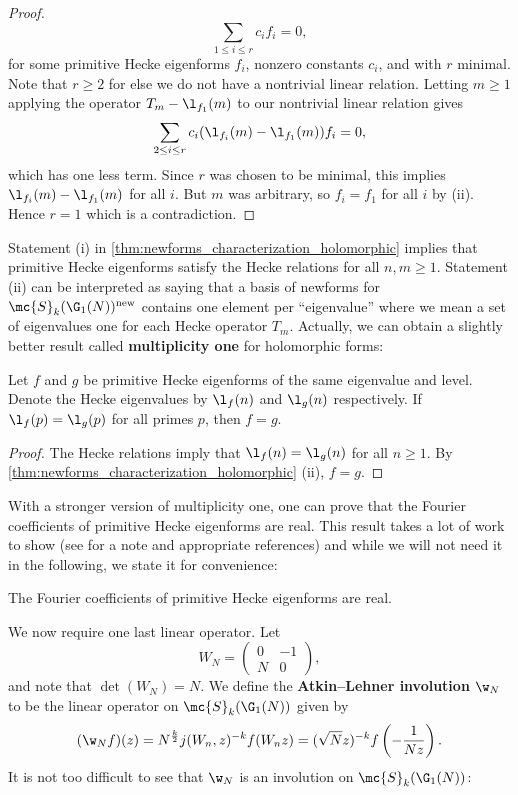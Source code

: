 \begin{proof}
      \[
        \sum_{1 \le i \le r}c_{i}f_{i} = 0,
      \]
      for some primitive Hecke eigenforms $f_{i}$, nonzero constants $c_{i}$, and with $r$ minimal. Note that $r \ge 2$ for else we do not have a nontrivial linear relation. Letting $m \ge 1$ applying the operator $T_{m}-\l_{f_{1}}(m)$ to our nontrivial linear relation gives
      \[
        \sum_{2 \le i \le r}c_{i}(\l_{f_{i}}(m)-\l_{f_{1}}(m))f_{i} = 0,
      \]
      which has one less term. Since $r$ was chosen to be minimal, this implies $\l_{f_{i}}(m)-\l_{f_{1}}(m)$ for all $i$. But $m$ was arbitrary, so $f_{i} = f_{1}$ for all $i$ by (ii). Hence $r = 1$ which is a contradiction.
    \end{proof}

    Statement (i) in \cref{thm:newforms_characterization_holomorphic} implies that primitive Hecke eigenforms satisfy the Hecke relations for all $n,m \ge 1$. Statement (ii) can be interpreted as saying that a basis of newforms for $\mc{S}_{k}(\G_{1}(N))^{\mathrm{new}}$ contains one element per ``eigenvalue'' where we mean a set of eigenvalues one for each Hecke operator $T_{m}$. Actually, we can obtain a slightly better result called \textbf{multiplicity one} for holomorphic forms:

    \begin{theorem}
      Let $f$ and $g$ be primitive Hecke eigenforms of the same eigenvalue and level. Denote the Hecke eigenvalues by $\l_{f}(n)$ and $\l_{g}(n)$ respectively. If $\l_{f}(p) = \l_{g}(p)$ for all primes $p$, then $f = g$.
    \end{theorem}
    \begin{proof}
      The Hecke relations imply that $\l_{f}(n) = \l_{g}(n)$ for all $n \ge 1$. By \cref{thm:newforms_characterization_holomorphic} (ii), $f = g$.
    \end{proof}
    
    With a stronger version of multiplicity one, one can prove that the Fourier coefficients of primitive Hecke eigenforms are real. This result takes a lot of work to show (see \cite{diamond2005first} for a note and appropriate references) and while we will not need it in the following, we state it for convenience:

    \begin{theorem}
      The Fourier coefficients of primitive Hecke eigenforms are real.
    \end{theorem}

    We now require one last linear operator. Let
    \[
      W_{N} = \begin{pmatrix} 0 & -1 \\ N & 0 \end{pmatrix},
    \]
    and note that $\det(W_{N}) = N$. We define the \textbf{Atkin–Lehner involution} $\w_{N}$ to be the linear operator on $\mc{S}_{k}(\G_{1}(N))$ given by
    \[
      (\w_{N}f)(z) = N^{\frac{k}{2}}j(W_{n},z)^{-k}f(W_{n}z) = (\sqrt{N}z)^{-k}f\left(-\frac{1}{Nz}\right).
    \]
    It is not too difficult to see that $\w_{N}$ is an involution on $\mc{S}_{k}(\G_{1}(N))$:

